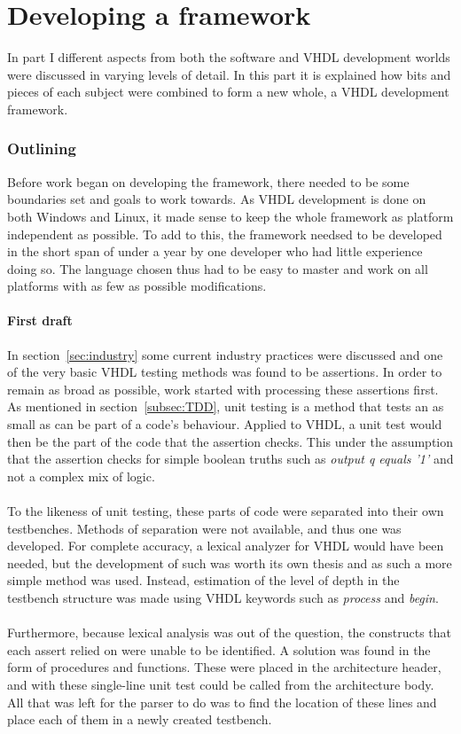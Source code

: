 \documentclass[11pt,british]{article}
\begin{document}
\newpage
\part{Developing a framework}
In part I different aspects from both the software and \gls{VHDL} development worlds were discussed in  varying levels of detail. In this part it is explained how bits and pieces of each subject were combined to form a new whole, a VHDL development framework.

\section{Outlining}
\label{sec:outlining}
Before work began on developing the framework, there needed to be some boundaries set and goals to work towards. As VHDL development is done on both Windows and Linux, it made sense to keep the whole framework as platform independent as possible. To add to this, the framework needsed to be developed in the short span of under a year by one developer who had little experience doing so. The language chosen thus had to be easy to master and work on all platforms with as few as possible modifications.

\subsection{First draft}
\label{subsec:first}
In section~\ref{sec:industry} some current industry practices were discussed and one of the very basic VHDL testing methods was found to be assertions. In order to remain as broad as possible, work started with processing these assertions first. As mentioned in section~\ref{subsec:TDD}, unit testing is a method that tests an as small as can be part of a code's behaviour. Applied to \gls{VHDL}, a unit test would then be the part of the code that the assertion checks. This under the assumption that the assertion checks for simple boolean truths such as \emph{output q equals '1'} and not a complex mix of logic.
\\
\\
To the likeness of unit testing, these parts of code were separated into their own testbenches. Methods of separation were not available, and thus one was developed. For complete accuracy, a lexical analyzer for VHDL would have been needed, but the development of such was worth its own thesis and as such a more simple method was used. Instead, estimation of the level of depth in the testbench structure was made using VHDL keywords such as \emph{process} and \emph{begin}.
\\
\\
Furthermore, because lexical analysis was out of the question, the constructs that each assert relied on were unable to be identified. A solution was found in the form of procedures and functions. These were placed in the architecture header, and with these single-line unit test could be called from the architecture body. All that was left for the parser to do was to find the location of these lines and place each of them in a newly created testbench.
\end{document}
